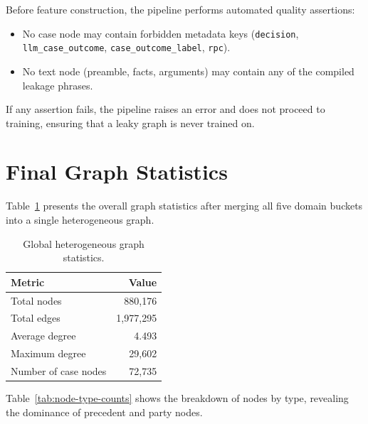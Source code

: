 Before feature construction, the pipeline performs automated quality assertions:

\begin{itemize}
    \item No case node may contain forbidden metadata keys (\texttt{decision}, \texttt{llm\_case\_outcome}, \texttt{case\_outcome\_label}, \texttt{rpc}).
    \item No text node (preamble, facts, arguments) may contain any of the compiled leakage phrases.
\end{itemize}

If any assertion fails, the pipeline raises an error and does not proceed to training, ensuring that a leaky graph is never trained on.

\section{Final Graph Statistics}
\label{sec:graph-stats}

Table~\ref{tab:graph-stats-global} presents the overall graph statistics after merging all five domain buckets into a single heterogeneous graph.

\begin{table}[H]
\centering
\caption{Global heterogeneous graph statistics.}
\label{tab:graph-stats-global}
\begin{tabular}{@{}lr@{}}
\toprule
\textbf{Metric} & \textbf{Value} \\
\midrule
Total nodes        & 880,176 \\
Total edges        & 1,977,295 \\
Average degree     & 4.493 \\
Maximum degree     & 29,602 \\
Number of case nodes & 72,735 \\
\bottomrule
\end{tabular}
\end{table}

Table~\ref{tab:node-type-counts} shows the breakdown of nodes by type, revealing the dominance of precedent and party nodes.

